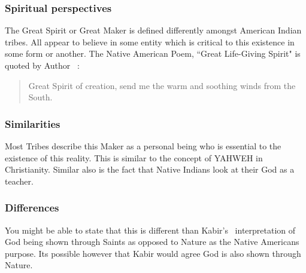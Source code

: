 \documentclass[11pt,a4paper]{scrartcl} %
\begin{document}
     \subsubsection{Spiritual perspectives}
     The Great Spirit or Great Maker is defined differently amongst American Indian tribes. All appear to believe in some entity which is critical to this existence in some form or another. The Native American Poem, ``Great Life-Giving Spirit" is quoted by Author ~\citealp[pg. 186]{eknath}:
\begin{quote}
 Great Spirit of creation, send me the warm and soothing winds from the South.
\end{quote}
     \subsubsection{Similarities}
     Most Tribes describe this Maker as a personal being who is essential to the existence of this reality. This is similar to the  concept of YAHWEH in Christianity. Similar also is the fact that Native Indians look at their God as a teacher.
     \subsubsection{Differences}
   You might be able to state that this is different than Kabir's~\citealp[pg. 40-41]{eknath} interpretation of God being shown through Saints as opposed to Nature as the Native Americans purpose. Its possible however that Kabir would agree God is also shown through Nature. 
\clearpage
    \nocite{*}
    
    
\end{document}
